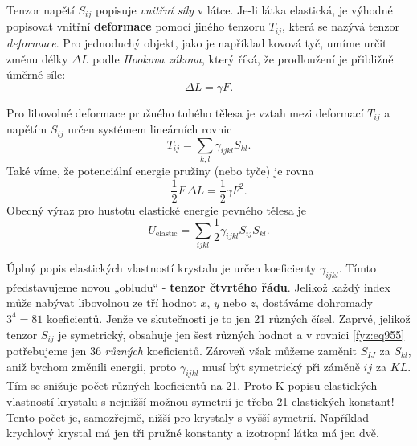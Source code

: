 {    Tenzor napětí \(S_{ij}\) popisuje \emph{vnitřní síly} v látce. Je-li látka elastická, je výhodné
    popisovat vnitřní \textbf{deformace} pomocí jiného tenzoru \(T_{ij}\), která se nazývá tenzor
    \emph{deformace}. Pro jednoduchý objekt, jako je například kovová tyč, umíme určit změnu délky
    \(ΔL\) podle \emph{Hookova zákona}, který říká, že prodloužení je přibližně úměrné síle:
    \begin{equation*}
      \Delta L=\gamma F.
    \end{equation*}
    
    Pro libovolné deformace pružného tuhého tělesa je vztah mezi deformací \(T_{ij}\) a napětím
    \(S_{ij}\) určen systémem lineárních rovnic 
    \begin{equation}\label{fyz:eq954}
      T_{ij}=\sum_{k,l}\gamma_{ijkl}S_{kl}.
    \end{equation}
    Také víme, že potenciální energie pružiny (nebo tyče) je rovna
    \begin{equation*}
      \dfrac{1}{2}F\,\Delta L=\dfrac{1}{2}\gamma F^2.
    \end{equation*}    
    Obecný výraz pro hustotu elastické energie pevného tělesa je
    \begin{equation}\label{fyz:eq955}
      U_{\text{elastic}}=\sum_{ijkl}\dfrac{1}{2}\gamma_{ijkl}S_{ij}S_{kl}.
    \end{equation}
    
    Úplný popis elastických vlastností krystalu je určen koeficienty \(\gamma_{ijkl}\). Tímto
    představujeme novou „obludu“ - \textbf{tenzor čtvrtého řádu}. Jelikož každý index může nabývat
    libovolnou ze tří hodnot \(x\), \(y\) nebo \(z\), dostáváme dohromady \(3^4 = 81\) koeficientů.
    Jenže ve skutečnosti je to jen 21 různých čísel. Zaprvé, jelikož tenzor \(S_{ij}\) je
    symetrický, obsahuje jen šest různých hodnot a v rovnici \eqref{fyz:eq955} potřebujeme jen 36
    \emph{různých} koeficientů. Zároveň však můžeme zaměnit \(S_{IJ}\) za \(S_{kl}\), aniž bychom
    změnili energii, proto \(\gamma_{ijkl}\) musí být symetrický při záměně \(ij\) za \(KL\). Tím se
    snižuje počet různých koeficientů na 21. Proto K popisu elastických vlastností krystalu s
    nejnižší možnou symetrií je třeba 21 elastických konstant! Tento počet je, samozřejmě, nižší pro
    krystaly s vyšší symetrií. Například krychlový krystal má jen tři pružné konstanty a izotropní
    látka má jen dvě.
    
}
